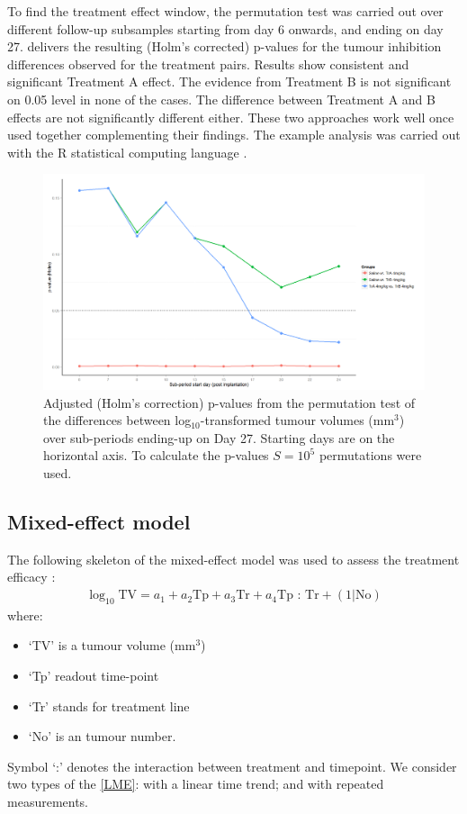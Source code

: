 To find the treatment effect window, the permutation test was carried out over different follow-up subsamples starting from day 6 onwards, and ending on day 27.
 delivers the resulting (Holm's corrected) p-values for the tumour inhibition differences observed for the treatment pairs.
Results show consistent and significant Treatment A effect.
The evidence from Treatment B is not significant on 0.05 level in none of the cases.
The difference between Treatment A and B effects are not significantly different either.
These two approaches work well once used together complementing their findings.
The example analysis was carried out with the R statistical computing language \autocite{rlang:2013}.

\begin{figure}
	\centering
	\includegraphics[width=\textwidth]{xenograph/figures/p-values_log.png}
	\caption{Adjusted (Holm's correction) p-values from the permutation test of the differences between log$_{10}$-transformed tumour volumes (mm$^3$) over sub-periods ending-up on Day 27.
		Starting days are on the horizontal axis.
		To calculate the p-values $S=10^5$ permutations were used.}
	\label{p-values_log}
\end{figure}


\subsection{Mixed-effect model}
The following skeleton of the mixed-effect model was used to assess the treatment efficacy \autocite{Laajala:2012kr,Demidenko:2010gn}:
\begin{align}
	\label{LME}
	\log_{10}\text{TV} = a_{1} + a_{2}\text{Tp} + a_{3}\text{Tr} + a_{4}\text{Tp : Tr} + (1|\text{No})
\end{align}
where:
\begin{itemize}
	\item `TV' is a tumour volume (mm$^3$)
	\item `Tp' readout time-point
	\item `Tr' stands for treatment line
	\item `No' is an tumour number.
\end{itemize}
Symbol `:' denotes the interaction between treatment and timepoint.
We consider two types of the \cref{LME}: with a linear time trend; and with repeated measurements.


